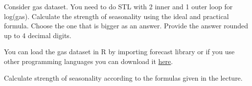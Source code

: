 
\begin{question}
Consider gas dataset. You need to do STL with 2 inner and 1 outer loop for log(gas). Calculate the strength of seasonality using the ideal and practical formula. Choose the one that is bigger as an answer. Provide the answer rounded up to 4 decimal digits.

You can load the gas dataset in R by importing forecast library or if you use other programming languages you can download it \href{https://github.com/vincentarelbundock/Rdatasets/blob/master/csv/forecast/gas.csv}{here}.
\end{question}

\begin{solution}
Calculate strength of seasonality according to the formulas given in the lecture.
\end{solution}

